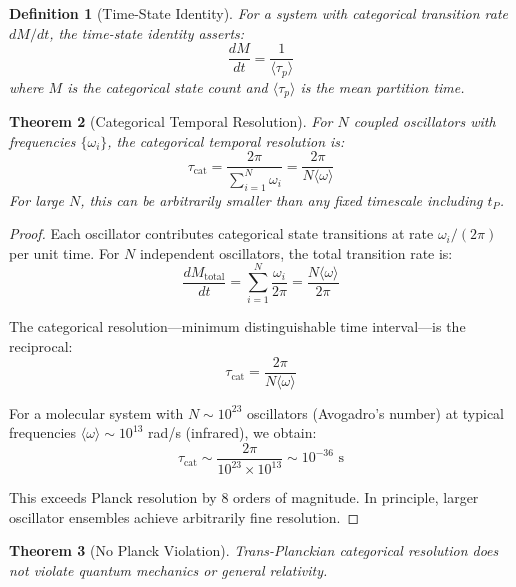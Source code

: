 \documentclass[twocolumn,10pt,a4paper]{article}
\newtheorem{theorem}{Theorem}[section]
\newtheorem{definition}[theorem]{Definition}
\begin{document}
\begin{definition}[Time-State Identity]
\label{def:time_state}
For a system with categorical transition rate $dM/dt$, the \emph{time-state identity} asserts:
\begin{equation}
\frac{dM}{dt} = \frac{1}{\langle \tau_p \rangle}
\end{equation}
where $M$ is the categorical state count and $\langle \tau_p \rangle$ is the mean partition time.
\end{definition}

\begin{theorem}[Categorical Temporal Resolution]
\label{thm:cat_resolution}
For $N$ coupled oscillators with frequencies $\{\omega_i\}$, the categorical temporal resolution is:
\begin{equation}
\tau_{\text{cat}} = \frac{2\pi}{\sum_{i=1}^N \omega_i} = \frac{2\pi}{N \langle \omega \rangle}
\end{equation}
For large $N$, this can be arbitrarily smaller than any fixed timescale including $t_P$.
\end{theorem}

\begin{proof}
Each oscillator contributes categorical state transitions at rate $\omega_i / (2\pi)$ per unit time. For $N$ independent oscillators, the total transition rate is:
\begin{equation}
\frac{dM_{\text{total}}}{dt} = \sum_{i=1}^N \frac{\omega_i}{2\pi} = \frac{N \langle \omega \rangle}{2\pi}
\end{equation}

The categorical resolution---minimum distinguishable time interval---is the reciprocal:
\begin{equation}
\tau_{\text{cat}} = \frac{2\pi}{N \langle \omega \rangle}
\end{equation}

For a molecular system with $N \sim 10^{23}$ oscillators (Avogadro's number) at typical frequencies $\langle \omega \rangle \sim 10^{13}$ rad/s (infrared), we obtain:
\begin{equation}
\tau_{\text{cat}} \sim \frac{2\pi}{10^{23} \times 10^{13}} \sim 10^{-36} \text{ s}
\end{equation}

This exceeds Planck resolution by 8 orders of magnitude. In principle, larger oscillator ensembles achieve arbitrarily fine resolution.
\end{proof}

\begin{theorem}[No Planck Violation]
\label{thm:no_violation}
Trans-Planckian categorical resolution does not violate quantum mechanics or general relativity.
\end{theorem}
\end{document}
